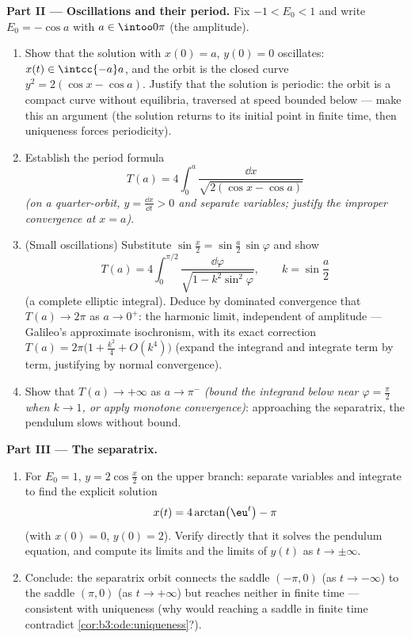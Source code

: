 \begin{problem}
\medskip
\noindent\textbf{Part II --- Oscillations and their period.}
Fix $-1 < E_0 < 1$ and write $E_0 = -\cos a$ with $a \in
\intoo0\pi$ (the amplitude).
\begin{enumerate}[resume]
  \item Show that the solution with $x(0) = a$, $y(0) = 0$
        oscillates: $x(t) \in \intcc{-a}a$, and the orbit is
        the closed curve $y^2 = 2(\cos x - \cos a)$. Justify
        that the solution is periodic: the orbit is a compact
        curve without equilibria, traversed at speed bounded
        below --- make this an argument (the solution returns
        to its initial point in finite time, then uniqueness
        forces periodicity).
  \item Establish the period formula
        \[
        T(a) = 4\int_0^{a}\frac{\dd x}{\sqrt{2(\cos x -
        \cos a)}}
        \]
        \emph{(on a quarter-orbit, $y = \frac{\dd x}{\dd t} >
        0$ and separate variables; justify the improper
        convergence at $x = a$)}.
  \item (Small oscillations) Substitute $\sin\frac x2 =
        \sin\frac a2\,\sin\varphi$ and show
        \[
        T(a) = 4\int_0^{\pi/2}\frac{\dd\varphi}{\sqrt{1 -
        k^2\sin^2\varphi}},
        \qquad k = \sin\frac a2
        \]
        (a complete elliptic integral). Deduce by dominated
        convergence that $T(a) \to 2\pi$ as $a \to 0^+$: the
        harmonic limit, independent of amplitude ---
        Galileo's approximate isochronism, with its exact
        correction $T(a) = 2\pi\bigl(1 + \frac{k^2}4 +
        O(k^4)\bigr)$ (expand the integrand and integrate
        term by term, justifying by normal convergence).
  \item Show that $T(a) \to +\infty$ as $a \to \pi^-$
        \emph{(bound the integrand below near $\varphi =
        \frac\pi2$ when $k \to 1$, or apply monotone
        convergence)}: approaching the separatrix, the
        pendulum slows without bound.
\end{enumerate}

\medskip
\noindent\textbf{Part III --- The separatrix.}
\begin{enumerate}[resume]
  \item For $E_0 = 1$, $y = 2\cos\frac x2$ on the upper
        branch: separate variables and integrate to find the
        explicit solution
        \[
        x(t) = 4\arctan\bigl(\eu^{t}\bigr) - \pi
        \]
        (with $x(0) = 0$, $y(0) = 2$). Verify directly that
        it solves the pendulum equation, and compute its
        limits and the limits of $y(t)$ as $t \to
        \pm\infty$.
  \item Conclude: the separatrix orbit connects the saddle
        $(-\pi, 0)$ (as $t \to -\infty$) to the saddle
        $(\pi, 0)$ (as $t \to +\infty$) but reaches neither
        in finite time --- consistent with uniqueness (why
        would reaching a saddle in finite time contradict
        \cref{cor:b3:ode:uniqueness}?).
\end{enumerate}


\end{problem}
